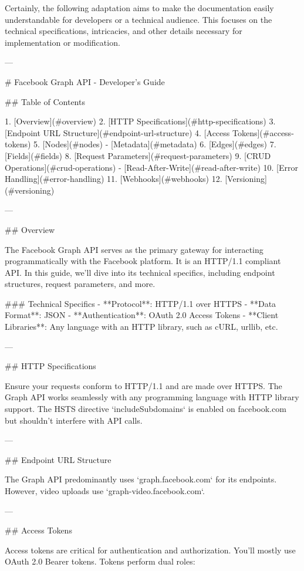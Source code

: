 Certainly, the following adaptation aims to make the documentation easily understandable for developers or a technical audience. This focuses on the technical specifications, intricacies, and other details necessary for implementation or modification.

---

# Facebook Graph API - Developer's Guide

## Table of Contents

1. [Overview](#overview)
2. [HTTP Specifications](#http-specifications)
3. [Endpoint URL Structure](#endpoint-url-structure)
4. [Access Tokens](#access-tokens)
5. [Nodes](#nodes)
    - [Metadata](#metadata)
6. [Edges](#edges)
7. [Fields](#fields)
8. [Request Parameters](#request-parameters)
9. [CRUD Operations](#crud-operations)
    - [Read-After-Write](#read-after-write)
10. [Error Handling](#error-handling)
11. [Webhooks](#webhooks)
12. [Versioning](#versioning)

---

## Overview

The Facebook Graph API serves as the primary gateway for interacting programmatically with the Facebook platform. It is an HTTP/1.1 compliant API. In this guide, we'll dive into its technical specifics, including endpoint structures, request parameters, and more.

### Technical Specifics
- **Protocol**: HTTP/1.1 over HTTPS
- **Data Format**: JSON
- **Authentication**: OAuth 2.0 Access Tokens
- **Client Libraries**: Any language with an HTTP library, such as cURL, urllib, etc.

---

## HTTP Specifications

Ensure your requests conform to HTTP/1.1 and are made over HTTPS. The Graph API works seamlessly with any programming language with HTTP library support. The HSTS directive `includeSubdomains` is enabled on facebook.com but shouldn't interfere with API calls.

---

## Endpoint URL Structure

The Graph API predominantly uses `graph.facebook.com` for its endpoints. However, video uploads use `graph-video.facebook.com`.

---

## Access Tokens

Access tokens are critical for authentication and authorization. You'll mostly use OAuth 2.0 Bearer tokens. Tokens perform dual roles:

